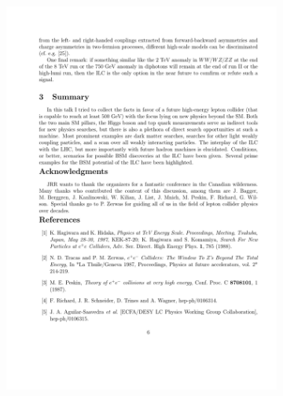 \begin{figure}[!htbp]
\begin{subfigure}[b]{0.24\textwidth}
        \includegraphics[width=\textwidth]{images/chapter3/formatted_sample2.pdf}
      \end{subfigure}
      \begin{subfigure}[b]{0.24\textwidth}

\end{subfigure}
\end{figure}
